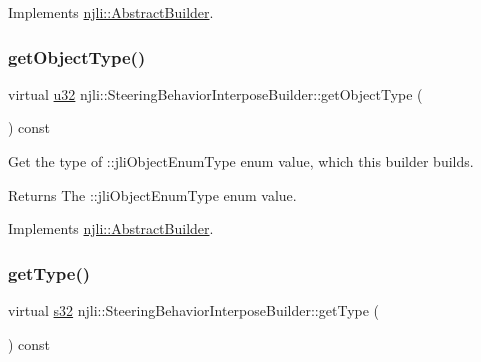 Implements \mbox{\hyperlink{classnjli_1_1_abstract_builder_a902f73ea78031b06aca183a417f3413b}{njli\+::\+Abstract\+Builder}}.

\mbox{\label{classnjli_1_1_steering_behavior_interpose_builder_a799a873e35c8a789604bd26428c21e62}} 
\subsubsection{\texorpdfstring{get\+Object\+Type()}{getObjectType()}}
{\footnotesize\ttfamily virtual \mbox{\hyperlink{_util_8h_a10e94b422ef0c20dcdec20d31a1f5049}{u32}} njli\+::\+Steering\+Behavior\+Interpose\+Builder\+::get\+Object\+Type (\begin{DoxyParamCaption}{ }\end{DoxyParamCaption}) const\hspace{0.3cm}{\ttfamily [virtual]}}

Get the type of \+::jli\+Object\+Enum\+Type enum value, which this builder builds.

\begin{DoxyReturn}{Returns}
The \+::jli\+Object\+Enum\+Type enum value. 
\end{DoxyReturn}


Implements \mbox{\hyperlink{classnjli_1_1_abstract_builder_a0f2d344fcf697b167f4f2b1122b5fb33}{njli\+::\+Abstract\+Builder}}.

\mbox{\label{classnjli_1_1_steering_behavior_interpose_builder_a9562aa01ebf6d4c86f248bb3e1b8b035}} 
\subsubsection{\texorpdfstring{get\+Type()}{getType()}}
{\footnotesize\ttfamily virtual \mbox{\hyperlink{_util_8h_aa62c75d314a0d1f37f79c4b73b2292e2}{s32}} njli\+::\+Steering\+Behavior\+Interpose\+Builder\+::get\+Type (\begin{DoxyParamCaption}{ }\end{DoxyParamCaption}) const\hspace{0.3cm}{\ttfamily [virtual]}}

